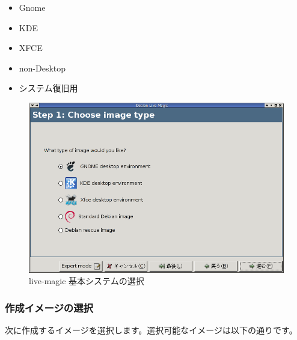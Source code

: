 \documentclass[mingoth,a4paper]{jsarticle}
\begin{document}
\begin{multicols}{2}
 \begin{itemize}
 \item Gnome
 \item KDE
 \item XFCE
 \item non-Desktop
 \item システム復旧用 
 \end{itemize}

 \begin{figure}[H]
 \begin{center}
  \includegraphics[width=1\hsize]{image200711/live-magic01.png}
 \end{center}
 \caption{live-magic 基本システムの選択}
 \label{live-magic01}
 \end{figure}
\end{multicols}

\subsubsection{作成イメージの選択}
次に作成するイメージを選択します。選択可能なイメージは以下の通りです。
\end{document}

